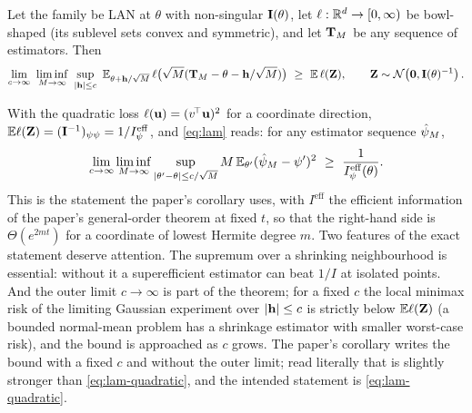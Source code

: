 \begin{theorem}
\label{thm:lam}
Let the family be LAN at $\theta$ with non-singular $\mathbf{I}(\theta)$, let
$\ell:\mathbb{R}^d\to[0,\infty)$ be bowl-shaped (its sublevel sets convex and symmetric),
and let $\mathbf{T}_{M}$ be any sequence of estimators. Then
\begin{equation}
  \lim_{c\to\infty}\ \liminf_{\nseq\to\infty}\ \sup_{|\vect h|\le c}\
  \E_{\theta+\vect h/\sqrt{\nseq}}\,\ell\bigl(\sqrt{\nseq}(\vect T_{\nseq}-\theta-\vect h/\sqrt{\nseq})\bigr)
  \ \ge\ \E\,\ell(\vect Z),\qquad \vect Z\sim\normal{\vect0}{\mat I(\theta)^{-1}} .
  \label{eq:lam}
\end{equation}
\end{theorem}

With the quadratic loss $\ell(\mathbf{u})=(v^{\!\top}\mathbf{u})^2$ for a coordinate direction,
$\mathbb{E}\ell(\mathbf{Z})=(\mathbf{I}^{-1})_{\psi\psi}=1/I^{\mathrm{eff}}_\psi$, and \cref{eq:lam} reads:
for any estimator sequence $\hat\psi_{M}$,
\begin{equation}
  \lim_{c\to\infty}\liminf_{\nseq\to\infty}\sup_{|\theta'-\theta|\le c/\sqrt{\nseq}}\nseq\,\E_{\theta'}(\hat\psi_{\nseq}-\psi')^2\ \ge\ \frac1{I^{\mathrm{eff}}_\psi(\theta)} .
  \label{eq:lam-quadratic}
\end{equation}
This is the statement the paper's corollary uses, with $I^{\mathrm{eff}}$ the efficient
information of the paper's general-order theorem at fixed $t$, so that the right-hand
side is $\Theta(e^{2mt})$ for a coordinate of lowest Hermite degree $m$. Two
features of the exact statement deserve attention. The supremum over a shrinking
neighbourhood is essential: without it a superefficient estimator can beat $1/I$ at
isolated points. And the outer limit $c\to\infty$ is part of the theorem; for a fixed
$c$ the local minimax risk of the limiting Gaussian experiment over $|\mathbf{h}|\le c$ is
strictly below $\mathbb{E}\ell(\mathbf{Z})$ (a bounded normal-mean problem has a shrinkage
estimator with smaller worst-case risk), and the bound is approached as $c$ grows. The
paper's corollary writes the bound with a fixed $c$ and without the outer limit; read
literally that is slightly stronger than \cref{eq:lam-quadratic}, and the intended
statement is \cref{eq:lam-quadratic}.

